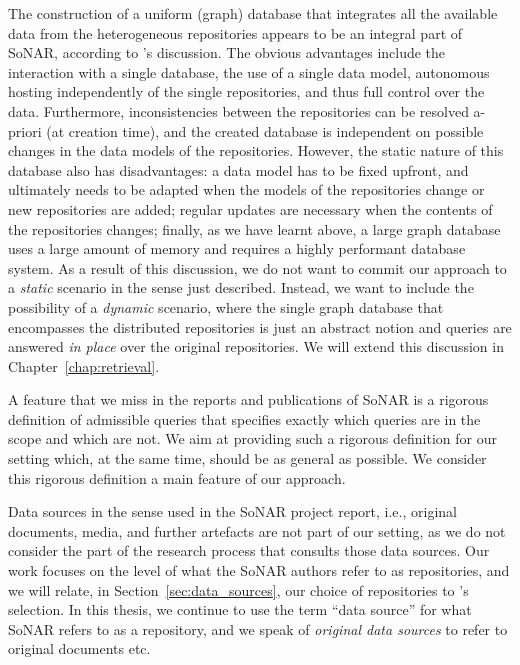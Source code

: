 The construction of a uniform (graph) database that integrates all the available data
from the heterogeneous repositories appears to be an integral part of \gls{SoNAR},
according to \citeauthor*{Menzel2020}'s \autocite*{Menzel2020} discussion.
The obvious advantages include the interaction with a single database,
the use of a single data model, autonomous hosting
independently of the single repositories, and thus full control over the data.
Furthermore, inconsistencies
between the repositories can be resolved a-priori (at creation time),
and the created database is independent on possible changes in the data models of the repositories.
However, the static nature of this database also has disadvantages:
a data model has to be fixed upfront, and ultimately needs to be adapted when
the models of the repositories change or new repositories are added;
regular updates are necessary when the contents of the repositories changes;
finally, as we have learnt above,
a large graph database uses a large amount of memory and requires a highly performant
database system.
As a result of this discussion,
we do not want to commit our approach to a \emph{static} scenario
in the sense just described.
Instead, we want to include the possibility of a \emph{dynamic} scenario,
where the single graph database that encompasses the distributed repositories
is just an abstract notion and queries are answered
\emph{in place} over the original repositories.
We will extend this discussion in Chapter~\ref{chap:retrieval}.

A feature that we miss in the reports and publications of \gls{SoNAR} is a rigorous definition of admissible queries
that specifies exactly which queries are in the scope and which are not.
We aim at providing such a rigorous definition for our setting
which, at the same time, should be as general as possible. We consider this rigorous definition
a main feature of our approach.

Data sources in the sense used in the \gls{SoNAR} project report,
i.e., original documents, media, and further artefacts
are not part of our setting, as we do not consider the part of the research process
that consults those data sources. Our work focuses on the level of
what the \gls{SoNAR} authors refer to as repositories,
and we will relate, in Section~\ref{sec:data_sources}, our choice of repositories
to \citeauthor*{Menzel2020}'s \autocite*{Menzel2020} selection.
In this thesis, we continue to use the term \enquote{data source} for what
\gls{SoNAR} refers to as a repository,
and we speak of \emph{original data sources} to refer to original documents etc.

